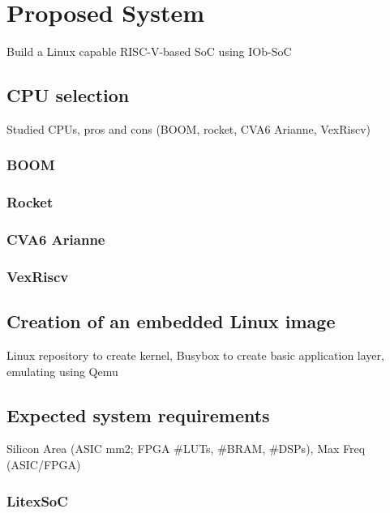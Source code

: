 \chapter{Proposed System}
\label{chapter:proposed system}
\quad Build a Linux capable RISC-V-based SoC using IOb-SoC

\section{CPU selection}
\quad Studied CPUs, pros and cons (BOOM, rocket, CVA6 Arianne, VexRiscv)
\subsection{BOOM}
\subsection{Rocket}
\subsection{CVA6 Arianne}
\subsection{VexRiscv}

\section{Creation of an embedded Linux image}
\quad Linux repository to create kernel, Busybox to create basic application layer, emulating using Qemu

\section{Expected system requirements}
\quad Silicon Area (ASIC mm2; FPGA #LUTs, #BRAM, #DSPs), Max Freq (ASIC/FPGA)
\subsection{LitexSoC}
  

